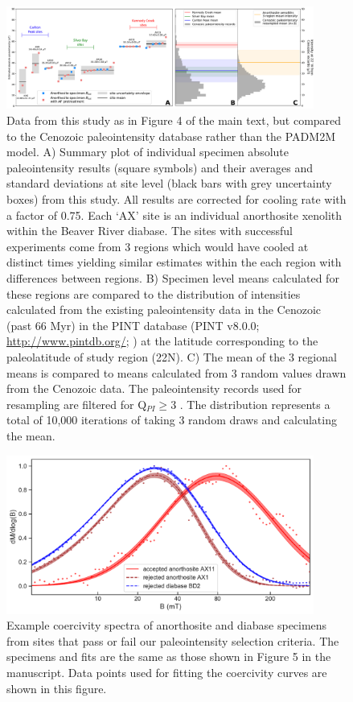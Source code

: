 \documentclass[9pt,twoside]{pnas-new}
\begin{document}
\begin{figure}[h!]
\noindent\includegraphics[width=0.9\textwidth]{Cenozoic_resample_SI.pdf}
\centering
\caption{\footnotesize{Data from this study as in Figure 4 of the main text, but compared to the Cenozoic paleointensity database rather than the PADM2M model. A) Summary plot of individual specimen absolute paleointensity results (square symbols) and their averages and standard deviations at site level (black bars with grey uncertainty boxes) from this study. All results are corrected for cooling rate with a factor of 0.75. Each `AX' site is an individual anorthosite xenolith within the Beaver River diabase. The sites with successful experiments come from 3 regions which would have cooled at distinct times yielding similar estimates within the each region with differences between regions. B) Specimen level means calculated for these regions are compared to the distribution of intensities calculated from the existing paleointensity data in the Cenozoic (past 66 Myr) in the PINT database (PINT v8.0.0; \url{http://www.pintdb.org/}; \citealp{Bono2021a}) at the latitude corresponding to the paleolatitude of study region (22\textdegree N). C) The mean of the 3 regional means is compared to means calculated from 3 random values drawn from the Cenozoic data. The paleointensity records used for resampling are filtered for Q$_{PI} \geq$3 \cite{Biggin2014a}. The distribution represents a total of 10,000 iterations of taking 3 random draws and calculating the mean.}}
\label{fig:Cenozoic_PINT}
\end{figure}

\clearpage

\begin{figure}[h!]
\noindent\includegraphics[width=0.9\textwidth]{example_unmix_plot_with_data.pdf}
\centering
\caption{\footnotesize{Example coercivity spectra of anorthosite and diabase specimens from sites that pass or fail our paleointensity selection criteria. The specimens and fits are the same as those shown in Figure 5 in the manuscript. Data points used for fitting the coercivity curves are shown in this figure. }}
\label{fig:Cenozoic_PINT}
\end{figure}
\end{document}
